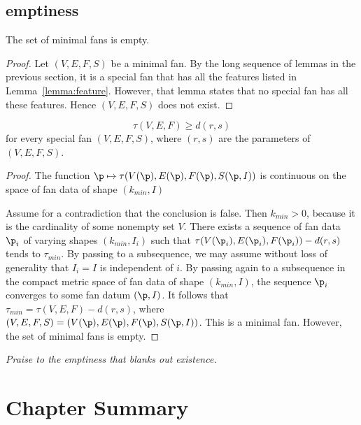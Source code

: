 \subsection{emptiness}


\begin{lemma}[]\label{lemma:min-empty}  
The set of minimal fans is empty.
\end{lemma}

\begin{proof} Let $(V,E,F,S)$ be a minimal fan.  By the long sequence
  of lemmas in the previous section, it is a special fan that has all
  the features listed in Lemma~\ref{lemma:feature}.  However, that
  lemma states that no special fan has all these features.  Hence
  $(V,E,F,S)$ does not exist.
\end{proof}

\begin{lemma}
\label{lemma:empty-d}
\begin{displaymath}
\tau(V,E,F) \ge d (r,s)
\end{displaymath}
for every special fan $(V,E,F,S)$, where $(r,s)$ are the parameters of
$(V,E,F,S)$.
\end{lemma}

\begin{proof} 
The function $\p\mapsto \tau(V(\p),E(\p),F(\p),S(\p,I))$ is
continuous on the space of fan data of shape $(k_{min},I)$

Assume for a contradiction that the conclusion is false.  Then
$k_{min}>0$, because it is the cardinality of some nonempty set $V$.
There exists a sequence of fan data $\p_i$ of varying shapes
$(k_{min},I_i)$ such that $\tau(V(\p_i),E(\p_i),F(\p_i))-d(r,s)$ tends
to $\tau_{min}$.  By passing to a subsequence, we may assume without
loss of generality that $I_i = I$ is independent of $i$.  By passing
again to a subsequence in the compact metric space of fan data of
shape $(k_{min},I)$, the sequence $\p_i$ converges to some fan datum
$(\p,I)$.  It follows that $\tau_{min} = \tau(V,E,F)-d(r,s)$, where
$(V,E,F,S)=(V(\p),E(\p),F(\p),S(\p,I))$.  This is a minimal fan.
However, the set of minimal fans is empty.
\end{proof}

 {\it Praise to
the emptiness that blanks out
existence.} %
%


\section{Chapter Summary}

